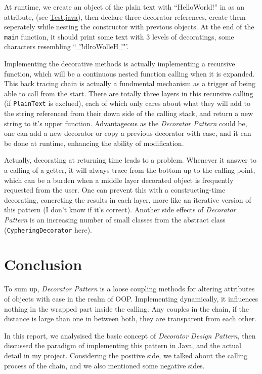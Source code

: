 \documentclass[a4paper]{article}
\begin{document}
At runtime, we create an object of the plain text with ``HelloWorld!'' in as an attribute, (see \underline{Test.java}), then declare three decorator references,
create them seperately while nesting the constructor with previous objects. At the end of the \texttt{main} function, it should print some text with 3 levels
of decoratings, some characters resembling ``\^\_\^!dlroWolleH\^\_\^''.

Implementing the decorative methods is actually implementing a recursive function, which will be a continuous nested function calling when it is expanded.
This back tracing chain is actually a fundmental mechanism as a trigger of being able to call from the start. There are totally three layers in this recursive
calling (if \texttt{PlainText} is exclued), each of which only cares about what they will add to the string referenced from their down side of the calling
stack, and return a new string to it's upper function. Advantageous as the \textit{Decorator Pattern} could be, one can add a new decorator or
copy a previous decorator with ease, and it can be done at runtime, enhancing the ability of modification.

Actually, decorating at returning time leads to a problem. Whenever it answer to a calling of a getter, it will always trace from the bottom up
to the calling point, which can be a burden when a middle layer decorated object is frequently requested from the user. One can prevent this with a constructing-time
decorating, concreting the results in each layer, more like an iterative version of this pattern (I don't know if it's correct). Another side effects
of \textit{Decorator Pattern} is an increasing number of small classes from the abstract class (\texttt{CypheringDecorator} here).

\section{Conclusion}

To sum up, \textit{Decorator Pattern} is a loose coupling methods for altering attributes of objects with ease in the realm of OOP. Implementing dynamically,
it influences nothing in the wrapped part inside the calling. Any couples in the chain, if the distance is large than one in between both, they are
transparent from each other.

In this report, we analysised the basic concept of \textit{Decorator Design Pattern}, then discussed the paradigm of implementing this pattern in Java,
and the actual detail in my project. Considering the positive side, we talked about the calling process of the chain, and we also mentioned some
negative sides.
\end{document}
